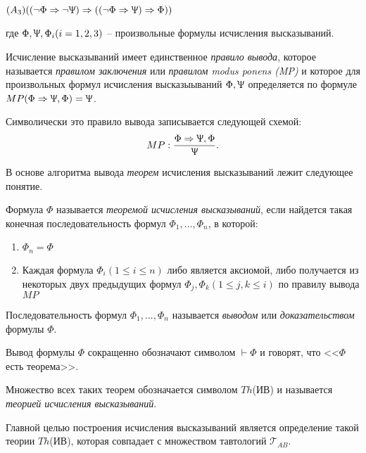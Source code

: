 $(A_3)((\lnot\Phi\Rightarrow\lnot\Uppsi)\Rightarrow((\lnot\Phi\Rightarrow\Uppsi)\Rightarrow\Phi))$

где $\Phi,\Uppsi,\Phi_i(i=1,2,3)$ -- произвольные формулы исчисления высказываний.

Исчисление высказываний имеет единственное \textit{правило вывода}, которое называется \textit{правилом заключения} или \textit{правилом modus ponens (MP)} и которое для произвольных формул исчисления высказыываний $\Phi,\Uppsi$ определяется по формуле $MP(\Phi\Rightarrow\Uppsi,\Phi)=\Uppsi$.

Символически это правило вывода записывается следующей схемой:
$$MP: \frac{\Phi\Rightarrow\Uppsi,\Phi}{\Uppsi}.$$

В основе алгоритма вывода \textit{теорем} исчисления высказываний лежит следующее понятие.

\begin{definition}
    Формула $\Phi$ называется \textit{теоремой исчисления высказываний}, если найдется такая конечная последовательность формул $\Phi_1,\ldots,\Phi_n$, в которой:

    \begin{enumerate}
        \item $\Phi_n = \Phi$
        \item Каждая формула $\Phi_i(1\leq i \leq n)$ либо является аксиомой, либо получается из некоторых двух предыдущих формул $\Phi_j,\Phi_k (1\leq j, k\leq i)$ по правилу вывода $MP$
    \end{enumerate}

    Последовательность формул $\Phi_1,\ldots,\Phi_n$ называется \textit{выводом} или \textit{доказательством} формулы $\Phi$.
\end{definition}

\begin{definition}
    Вывод формулы $\Phi$ сокращенно обозначают символом $\vdash\Phi$ и говорят, что <<$\Phi$ есть теорема>>.

    Множество всех таких теорем обозначается символом $Th$(ИВ) и называется \textit{теорией исчисления высказываний}.

    Главной целью построения исчисления высказываний является определение такой теории $Th$(ИВ), которая совпадает с множеством тавтологий $\mathscr{T}_{AB}$.
\end{definition}